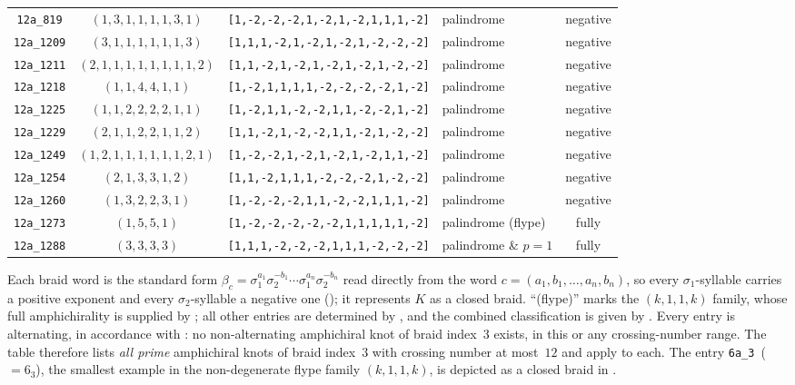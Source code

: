 \documentclass[11pt]{article}
\theoremstyle{definition}
\begin{document}
\begin{landscape}
\begin{longtable}{c c c l c}
\texttt{12a\_819} & $(1,3,1,1,1,1,3,1)$ & \texttt{[1,-2,-2,-2,1,-2,1,-2,1,1,1,-2]} & palindrome & negative\\
\texttt{12a\_1209} & $(3,1,1,1,1,1,1,3)$ & \texttt{[1,1,1,-2,1,-2,1,-2,1,-2,-2,-2]} & palindrome & negative\\
\texttt{12a\_1211} & $(2,1,1,1,1,1,1,1,1,2)$ & \texttt{[1,1,-2,1,-2,1,-2,1,-2,1,-2,-2]} & palindrome & negative\\
\texttt{12a\_1218} & $(1,1,4,4,1,1)$ & \texttt{[1,-2,1,1,1,1,-2,-2,-2,-2,1,-2]} & palindrome & negative\\
\texttt{12a\_1225} & $(1,1,2,2,2,2,1,1)$ & \texttt{[1,-2,1,1,-2,-2,1,1,-2,-2,1,-2]} & palindrome & negative\\
\texttt{12a\_1229} & $(2,1,1,2,2,1,1,2)$ & \texttt{[1,1,-2,1,-2,-2,1,1,-2,1,-2,-2]} & palindrome & negative\\
\texttt{12a\_1249} & $(1,2,1,1,1,1,1,1,2,1)$ & \texttt{[1,-2,-2,1,-2,1,-2,1,-2,1,1,-2]} & palindrome & negative\\
\texttt{12a\_1254} & $(2,1,3,3,1,2)$ & \texttt{[1,1,-2,1,1,1,-2,-2,-2,1,-2,-2]} & palindrome & negative\\
\texttt{12a\_1260} & $(1,3,2,2,3,1)$ & \texttt{[1,-2,-2,-2,1,1,-2,-2,1,1,1,-2]} & palindrome & negative\\
\texttt{12a\_1273} & $(1,5,5,1)$ & \texttt{[1,-2,-2,-2,-2,-2,1,1,1,1,1,-2]} & palindrome (flype) & fully\\
\texttt{12a\_1288} & $(3,3,3,3)$ & \texttt{[1,1,1,-2,-2,-2,1,1,1,-2,-2,-2]} & palindrome \& $p=1$ & fully\\
\bottomrule
\end{longtable}

\smallskip
\noindent\footnotesize
Each braid word is the standard form
$\beta_c=\sigma_{1}^{a_1}\sigma_{2}^{-b_1}\cdots\sigma_{1}^{a_n}\sigma_{2}^{-b_n}$
read directly from the word $c=(a_1,b_1,\dots,a_n,b_n)$, so every
$\sigma_{1}$-syllable carries a positive exponent and every $\sigma_{2}$-syllable a
negative one (); it represents $K$ as a closed
braid. ``(flype)'' marks the $(k,1,1,k)$ family, whose full amphichirality is
supplied by ; all other entries are determined by
, and the combined classification is given by .
Every entry is alternating, in accordance with
: no non-alternating amphichiral knot of braid
index~$3$ exists, in this or any crossing-number range. The table therefore lists
\emph{all prime} amphichiral knots of braid index~$3$ with crossing number at most~$12$ and
 apply to each. The entry \texttt{6a\_3}~($=6_3$), the smallest example in the non-degenerate flype family $(k,1,1,k)$, is depicted as a closed braid in .
\end{landscape}
\end{document}
